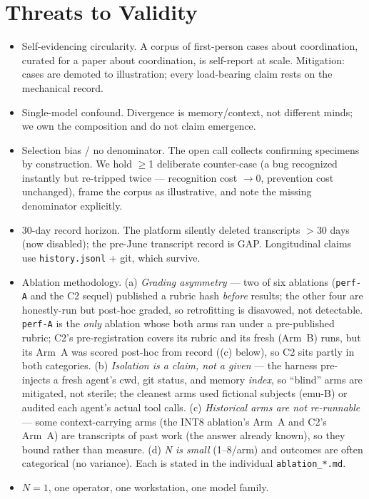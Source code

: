 \documentclass[10pt,conference]{IEEEtran}   %
\begin{document}
\section{Threats to Validity}
\label{sec:threats}
\begin{itemize}
\item Self-evidencing circularity. A corpus of first-person cases
  about coordination, curated for a paper about coordination, is self-report at scale.
  Mitigation: cases are demoted to illustration; every load-bearing claim rests on the
  mechanical record.
\item Single-model confound. Divergence is memory/context, not different minds; we own
  the composition and do not claim emergence.
\item Selection bias / no denominator. The open call collects confirming specimens by
  construction. We hold $\geq$1 deliberate counter-case (a bug recognized instantly but
  re-tripped twice --- recognition cost $\rightarrow$0, prevention cost unchanged), frame the
  corpus as illustrative, and note the missing denominator explicitly.
\item 30-day record horizon. The platform silently deleted transcripts $>$30 days (now
  disabled); the pre-June transcript record is GAP. Longitudinal claims use \texttt{history.jsonl}
  + git, which survive.
\item Ablation methodology. (a) \emph{Grading
  asymmetry} --- two of six ablations (\texttt{perf-A} and the C2 sequel) published a rubric hash
  \emph{before} results; the other four are honestly-run but post-hoc graded, so
  retrofitting is disavowed, not detectable. \texttt{perf-A} is the \emph{only} ablation whose
  both arms ran under a pre-published rubric; C2's pre-registration covers its rubric and
  its fresh (Arm~B) runs, but its Arm~A was scored post-hoc from record ((c) below), so C2 sits
  partly in both categories. (b) \emph{Isolation is a claim, not a given} --- the
  harness pre-injects a fresh agent's cwd, git status, and memory \emph{index}, so ``blind'' arms
  are mitigated, not sterile; the cleanest arms used fictional subjects (emu-B) or
  audited each agent's actual tool calls. (c) \emph{Historical arms are not re-runnable} --- some
  context-carrying arms (the INT8 ablation's Arm~A and C2's Arm~A) are transcripts of past work
  (the answer already known), so they bound
  rather than measure. (d) \emph{N is small} (1--8/arm) and outcomes are often categorical (no
  variance). Each is stated in the individual \texttt{ablation\_*.md}.
\item $N{=}1$, one operator, one workstation, one model family.

\end{itemize}
\end{document}

